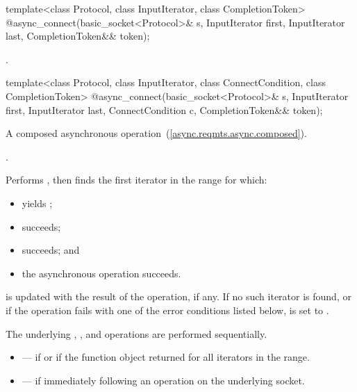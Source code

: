 \begin{itemdecl}
template<class Protocol, class InputIterator, class CompletionToken>
  @\DEDUCED@ async_connect(basic_socket<Protocol>& s,
                        InputIterator first, InputIterator last,
                        CompletionToken&& token);
\end{itemdecl}

\begin{itemdescr}
\pnum
\returns {}.
\end{itemdescr}

\begin{itemdecl}
template<class Protocol, class InputIterator,
  class ConnectCondition, class CompletionToken>
    @\DEDUCED@ async_connect(basic_socket<Protocol>& s,
                          InputIterator first, InputIterator last,
                          ConnectCondition c,
                          CompletionToken&& token);
\end{itemdecl}

\begin{itemdescr}
\pnum
A composed asynchronous operation~(\ref{async.reqmts.async.composed}).

\pnum
\completionsig {}.

\pnum
\effects Performs , then finds the first iterator  in the range  for which:
\begin{itemize}
\item
{} yields ;
\item
{} succeeds;
\item
{} succeeds; and
\item
 the asynchronous operation  succeeds.
\end{itemize}
\pnum
{} is updated with the result of the  operation, if any. If no such iterator is found, or if the operation fails with one of the error conditions listed below,  is set to . \begin{note} The underlying , , and  operations are performed sequentially. \end{note}

\pnum
\errors
\begin{itemize}
\item
{} --- if  or if the function object  returned  for all iterators in the range.
\item
{} --- if  immediately following an  operation on the underlying socket.
\end{itemize}
\end{itemdescr}



